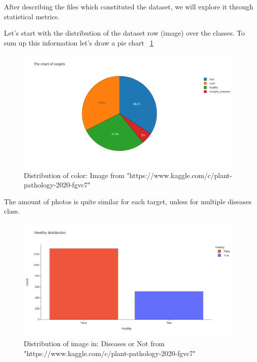 \documentclass[a4paper]{article}
\begin{document}
After describing the files which constituted the dataset, we will explore it through statistical metrics.

Let's start with the distribution of the dataset row (image) over the classes. To sum up this information let's draw a pie chart ~\ref{fig:pie}


    \begin{figure}[H]
      \includegraphics[width=\linewidth]{images/pie.png}
      \caption{Distribution of color: Image from "https://www.kaggle.com/c/plant-pathology-2020-fgvc7"}
      \label{fig:pie}
    \end{figure}


The amount of photos is quite similar for each target, unless for multiple diseases class. \\

   \begin{figure}[H]
      \includegraphics[width=\linewidth]{images/histo_classes.png}
      \caption{Distribution of image in: Diseases or Not from "https://www.kaggle.com/c/plant-pathology-2020-fgvc7"}
      \label{fig:histo}
    \end{figure}
\end{document}
